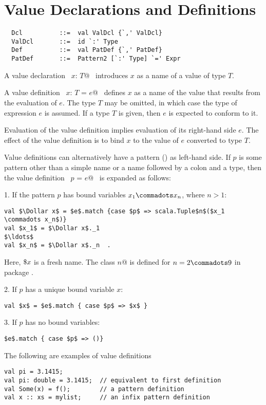 \documentclass[a4paper,12pt,twoside,titlepage]{book}
\begin{document}
\section{Value Declarations and Definitions}
\label{sec:valdef}

\syntax\begin{lstlisting}
  Dcl          ::=  val ValDcl {`,' ValDcl}
  ValDcl       ::=  id `:' Type
  Def          ::=  val PatDef {`,' PatDef}
  PatDef       ::=  Pattern2 [`:' Type] `=' Expr
\end{lstlisting}

A value declaration ~\lstinline@val $x$: $T$@~ introduces $x$ as a name of a value of
type $T$.  

A value definition ~\lstinline@val $x$: $T$ = $e$@~ defines $x$ as a name of the
value that results from the evaluation of $e$. The type $T$ may be
omitted, in which case the type of expression $e$ is assumed.
If a type $T$ is given, then $e$ is expected to conform to it.

Evaluation of the value definition implies evaluation of its
right-hand side $e$.  The effect of the value definition is to bind
$x$ to the value of $e$ converted to type $T$.

Value definitions can alternatively have a pattern
() as left-hand side.  If $p$ is some pattern other
than a simple name or a name followed by a colon and a type, then the
value definition ~\lstinline@val $p$ = $e$@~ is expanded as follows:

1. If the pattern $p$ has bound variables $x_1 \commadots x_n$, where $n > 1$:
\begin{lstlisting}
val $\Dollar x$ = $e$.match {case $p$ => scala.Tuple$n$($x_1 \commadots x_n$)}
val $x_1$ = $\Dollar x$._1
$\ldots$
val $x_n$ = $\Dollar x$._n  .
\end{lstlisting}
Here, $\mbox{\$} x$ is a fresh name.  The class
\lstinline@Tuple$n$@ is defined for $n = 2 \commadots 9$ in package
.

2. If $p$ has a unique bound variable $x$:
\begin{lstlisting}
val $x$ = $e$.match { case $p$ => $x$ }
\end{lstlisting}

3. If $p$ has no bound variables:
\begin{lstlisting}
$e$.match { case $p$ => ()}
\end{lstlisting}

\example
The following are examples of value definitions
\begin{lstlisting}
val pi = 3.1415;
val pi: double = 3.1415;  // equivalent to first definition
val Some(x) = f();        // a pattern definition
val x :: xs = mylist;     // an infix pattern definition
\end{lstlisting}
\end{document}
